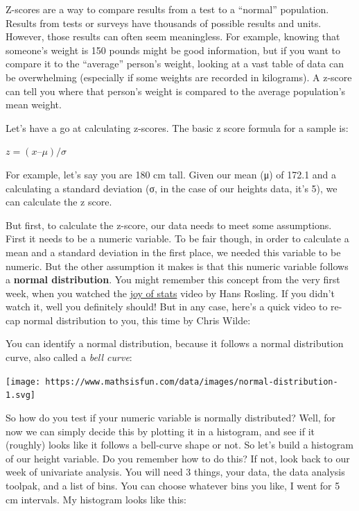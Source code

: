 \documentclass[
]{book}
\begin{document}
Z-scores are a way to compare results from a test to a ``normal'' population. Results from tests or surveys have thousands of possible results and units. However, those results can often seem meaningless. For example, knowing that someone's weight is 150 pounds might be good information, but if you want to compare it to the ``average'' person's weight, looking at a vast table of data can be overwhelming (especially if some weights are recorded in kilograms). A z-score can tell you where that person's weight is compared to the average population's mean weight.

Let's have a go at calculating z-scores. The basic z score formula for a sample is:

\(z = (x – μ) / σ\)

For example, let's say you are 180 cm tall. Given our mean (μ) of 172.1 and a calculating a standard deviation (σ, in the case of our heights data, it's 5), we can calculate the z score.

But first, to calculate the z-score, our data needs to meet some assumptions. First it needs to be a numeric variable. To be fair though, in order to calculate a mean and a standard deviation in the first place, we needed this variable to be numeric. But the other assumption it makes is that this numeric variable follows a \textbf{normal distribution}. You might remember this concept from the very first week, when you watched the \href{http://www.gapminder.org/videos/the-joy-of-stats/}{joy of stats} video by Hans Rosling. If you didn't watch it, well you definitely should! But in any case, here's a quick video to re-cap normal distribution to you, this time by Chris Wilde:

You can identify a normal distribution, because it follows a normal distribution curve, also called a \emph{bell curve}:

\texttt{[image: https://www.mathsisfun.com/data/images/normal-distribution-1.svg]}

So how do you test if your numeric variable is normally distributed? Well, for now we can simply decide this by plotting it in a histogram, and see if it (roughly) looks like it follows a bell-curve shape or not. So let's build a histogram of our height variable. Do you remember how to do this? If not, look back to our week of univariate analysis. You will need 3 things, your data, the data analysis toolpak, and a list of bins. You can choose whatever bins you like, I went for 5 cm intervals. My histogram looks like this:
\end{document}
